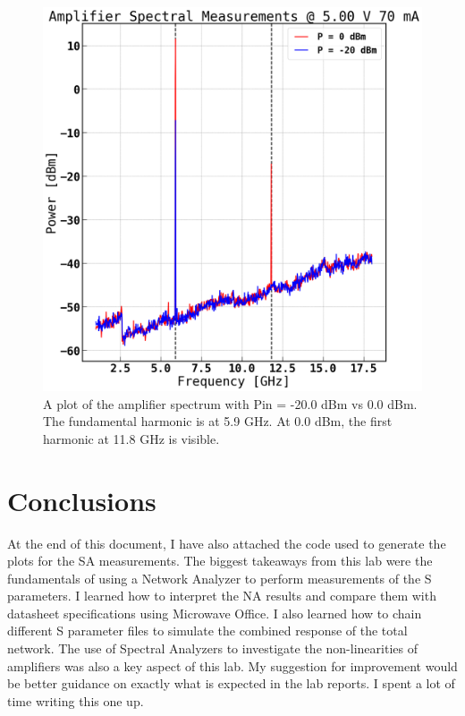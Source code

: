 \documentclass[twocolumn, aps, apl]{revtex4-1}
\begin{document}
\begin{figure}[!htbp]
    \centering
    \includegraphics[scale=0.30]{spectra_20dB_vs_0dB.png}
    \caption{A plot of the amplifier spectrum with Pin = -20.0 dBm vs 0.0 dBm. The fundamental harmonic is at 5.9 GHz. At 0.0 dBm, the first harmonic at 11.8 GHz is visible.}
    \label{fig:spectra}
\end{figure}

\section*{Conclusions}
At the end of this document, I have also attached the code used to generate the plots for the SA measurements. The biggest takeaways from this lab were the fundamentals of using a Network Analyzer to perform measurements of the S parameters. I learned how to interpret the NA results and compare them with datasheet specifications using Microwave Office. I also learned how to chain different S parameter files to simulate the combined response of the total network. The use of Spectral Analyzers to investigate the non-linearities of amplifiers was also a key aspect of this lab. My suggestion for improvement would be better guidance on exactly what is expected in the lab reports. I spent a lot of time writing this one up.
\end{document}
